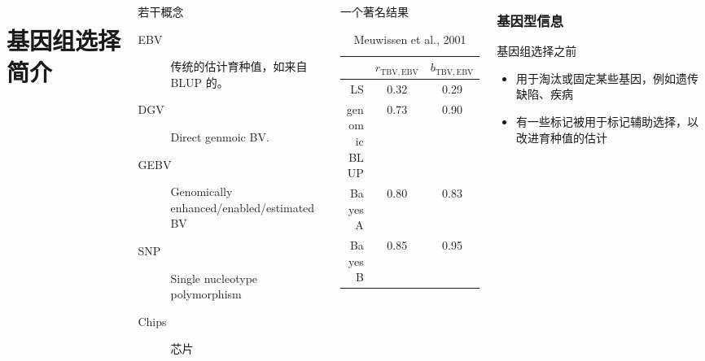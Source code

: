 \documentclass[serif,aspectratio=169]{beamer}
\begin{document}
\begin{frame}
\begin{columns}
\section{基因组选择简介}
\begin{frame}
  \begin{columns}
    \begin{column}{.5\textwidth}
      \begin{block}{若干概念}
        \begin{description}
        \item [EBV] 传统的估计育种值，如来自 BLUP 的。
        \item [DGV] Direct genmoic BV.
        \item [GEBV] Genomically enhanced/enabled/estimated BV
        \item [SNP] Single nucleotype polymorphism
        \item [Chips] 芯片
        \end{description}
      \end{block}
    \end{column}

    \pause
    \begin{column}{.5\textwidth}
      \begin{block}{一个著名结果}
        \begin{table}
          \caption{Meuwissen et al., 2001}
          \begin{tabular}{rcc}
            & $r_{\mathrm{TBV,EBV}}$ & $b_{\mathrm{TBV,EBV}}$\\\hline
            LS & 0.32 & 0.29\\
            genomic BLUP & 0.73 & 0.90\\
            Bayes A & 0.80 & 0.83\\
            Bayes B & 0.85 & 0.95
          \end{tabular}
        \end{table}
      \end{block}
    \end{column}
  \end{columns}
\end{frame}


\begin{frame}
  \frametitle{基因型信息}
  \begin{block}{基因组选择之前}
    \begin{itemize}
    \item 用于淘汰或固定某些基因，例如遗传缺陷、疾病
    \item 有一些标记被用于标记辅助选择，以改进育种值的估计
    \end{itemize}
  \end{block}


\end{frame}
\end{columns}
\end{frame}
\end{document}
